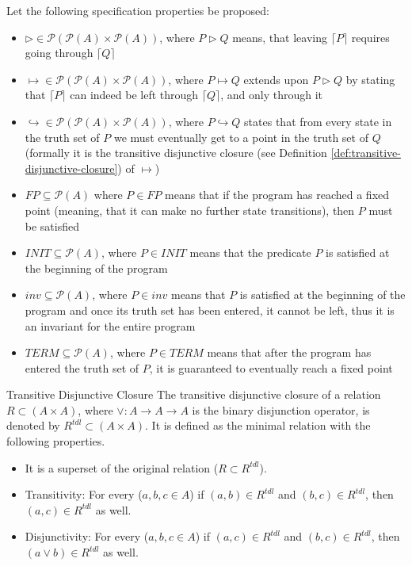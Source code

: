 Let the following specification properties be proposed:
\begin{itemize}
    \item $\rhd \in \mathcal{P}(\mathcal{P}(A) \times \mathcal{P}(A))$, where $P \rhd Q$ means, that leaving $\lceil P \rceil$ requires going through $\lceil Q \rceil$
    \item $\mapsto \in \mathcal{P}(\mathcal{P}(A) \times \mathcal{P}(A))$, where $P \mapsto Q$ extends upon $P \rhd Q$ by stating that $\lceil P \rceil$ can indeed be left through $\lceil Q \rceil$, and only through it
    \item $\hookrightarrow \in \mathcal{P}(\mathcal{P}(A) \times
      \mathcal{P}(A))$, where $P \hookrightarrow Q$ states that from every state in the truth set of $P$ we must eventually get to a point in the truth set of $Q$ (formally it is the transitive disjunctive closure (see Definition
      \ref{def:transitive-disjunctive-closure}) of $\mapsto$)
    \item $FP \subseteq \mathcal{P}(A)$ where $P \in FP$ means that if the program has reached a fixed point (meaning, that it can make no further state transitions), then $P$ must be satisfied
    \item $INIT \subseteq \mathcal{P}(A)$, where $P \in INIT$ means that the predicate $P$ is satisfied at the beginning of the program
    \item $inv \subseteq \mathcal{P}(A)$, where $P \in inv$ means that $P$ is satisfied at the beginning of the program and once its truth set has been entered, it cannot be left, thus it is an invariant for the entire program
    \item $TERM \subseteq \mathcal{P}(A)$, where $P \in TERM$ means that after the program has entered the truth set of $P$, it is guaranteed to eventually reach a fixed point
\end{itemize}

\begin{definition}{Transitive Disjunctive Closure}
\label{def:transitive-disjunctive-closure}
The transitive disjunctive closure of a relation $R \subset (A \times A)$, where $\lor : A \to A \to A$ is the binary disjunction operator, is denoted by $R^{tdl} \subset (A \times A)$. It is defined as the minimal relation with the following properties.
\begin{itemize}
    \item It is a superset of the original relation ($R \subset R^{tdl}$).
    \item Transitivity: For every ($a, b, c \in A$) if $(a, b) \in R^{tdl}$ and $(b, c) \in R^{tdl}$, then $(a, c) \in R^{tdl}$ as well.
    \item Disjunctivity: For every ($a, b, c \in A$) if $(a, c) \in R^{tdl}$ and $(b, c) \in R^{tdl}$, then $(a \lor b) \in R^{tdl}$ as well.
\end{itemize}
\end{definition}

